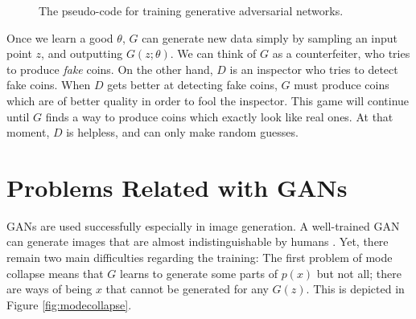 \documentclass[a4paper,onesided,12pt]{report}
\begin{document}
%
\begin{figure}[htbp]
\begin{center}
\end{center}
\caption{The pseudo-code for training generative adversarial networks.}
\label{alg:gan}
\end{figure}

Once we learn a good $\theta$, $G$ can generate new data simply by sampling an input point $z$, and outputting $G(z;\theta)$. We can think of $G$ as a counterfeiter, who tries to produce \emph{fake} coins. On the other hand, $D$ is an inspector who tries to detect fake coins. When $D$ gets better at detecting fake coins, $G$ must produce coins which are of better quality in order to fool the inspector. This game will continue until $G$ finds a way to produce coins which exactly look like real ones. At that moment, $D$ is helpless, and can only make random guesses.

\section{Problems Related with GANs}
\label{sec:problems}

GANs are used successfully especially in image generation. A well-trained GAN can generate images that are almost indistinguishable by humans \cite{karras2017progressive,brock2018large,karras2019style}. Yet, there remain two main difficulties regarding the training: The first problem of mode collapse means that $G$ learns to generate some parts of $p(x)$ but not all; there are ways of being $x$ that cannot be generated for any $G(z)$. This is depicted in Figure \ref{fig:modecollapse}.
\end{document}
